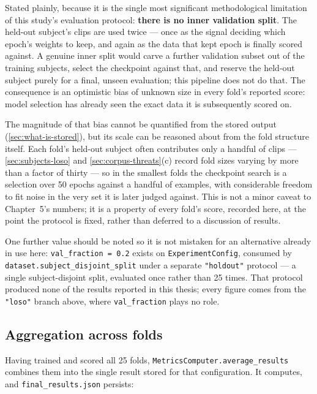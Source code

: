 Stated plainly, because it is the single most significant methodological limitation of this study's evaluation protocol: \textbf{there is no inner validation split}. The held-out subject's clips are used twice --- once as the signal deciding which epoch's weights to keep, and again as the data that kept epoch is finally scored against. A genuine inner split would carve a further validation subset out of the training subjects, select the checkpoint against that, and reserve the held-out subject purely for a final, unseen evaluation; this pipeline does not do that. The consequence is an optimistic bias of unknown size in every fold's reported score: model selection has already seen the exact data it is subsequently scored on.

The magnitude of that bias cannot be quantified from the stored output (\autoref{sec:what-is-stored}), but its scale can be reasoned about from the fold structure itself. Each fold's held-out subject often contributes only a handful of clips --- \autoref{sec:subjects-loso} and \autoref{sec:corpus-threats}(c) record fold sizes varying by more than a factor of thirty --- so in the smallest folds the checkpoint search is a selection over 50 epochs against a handful of examples, with considerable freedom to fit noise in the very set it is later judged against. This is not a minor caveat to Chapter~5's numbers; it is a property of every fold's score, recorded here, at the point the protocol is fixed, rather than deferred to a discussion of results.

One further value should be noted so it is not mistaken for an alternative already in use here: \texttt{val\_fraction = 0.2} exists on \texttt{ExperimentConfig}, consumed by \verb|dataset.subject_disjoint_split| under a separate \texttt{"holdout"} protocol --- a single subject-disjoint split, evaluated once rather than 25 times. That protocol produced none of the results reported in this thesis; every figure comes from the \texttt{"loso"} branch above, where \texttt{val\_fraction} plays no role.

\subsection{Aggregation across folds}
\label{sec:aggregation}

Having trained and scored all 25 folds, \verb|MetricsComputer.average_results| combines them into the single result stored for that configuration. It computes, and \texttt{final\_results.json} persists:

